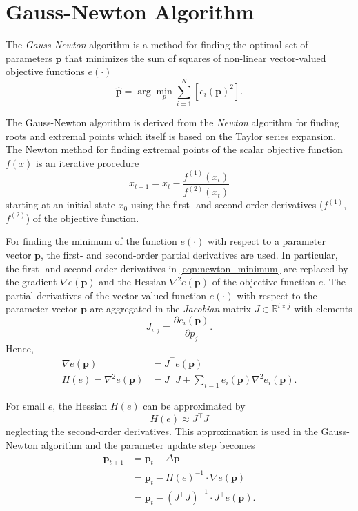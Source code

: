 \section{Gauss-Newton Algorithm}

The \textit{Gauss-Newton} algorithm is a method for finding the optimal set of parameters $\mathbf{p}$ that minimizes the sum of squares of non-linear vector-valued objective functions $e(\cdot)$
%
\begin{equation}
\hat{\mathbf{p}} = \arg\min_{p} \sum_{i=1}^N\left[ e_i(\mathbf{p})^2\right] .
\end{equation}

The Gauss-Newton algorithm is derived from the \textit{Newton} algorithm for finding roots and extremal points which itself is based on the Taylor series expansion. The Newton method for finding extremal points of the scalar objective function $f(x)$ is an iterative procedure
%
\begin{equation}
x_{t+1} = x_t - \frac{f^{(1)}(x_t)}{f^{(2)}(x_t)}
\label{eqn:newton_minimum}
\end{equation}
%
starting at an initial state $x_0$ using the first- and second-order derivatives ($f^{(1)}$, $f^{(2)}$) of the objective function.

For finding the minimum of the function $e(\cdot)$ with respect to a parameter vector $\mathbf{p}$, the first- and second-order partial derivatives are used. In particular, the first- and second-order derivatives in \ref{eqn:newton_minimum} are replaced by the gradient $\nabla e(\mathbf{p})$ and the Hessian $\nabla^2 e(\mathbf{p})$ of the objective function $e$.
The partial derivatives of the vector-valued function $e(\cdot)$ with respect to the parameter vector $\mathbf{p}$ are aggregated in the \textit{Jacobian} matrix $J\in \mathbb{R}^{i \times j}$ with elements
%
\begin{equation}
J_{i,j} = \frac{\partial e_i(\mathbf{p})}{\partial p_j} .
\end{equation}
%
Hence,
\begin{align}
\nabla e(\mathbf{p}) &= J^\top e(\mathbf{p}) \label{eqn:gn_gradient}\\
H(e) = \nabla^2 e(\mathbf{p}) &= J^\top J +  \sum_{i=1} e_i(\mathbf{p}) \nabla^2 e_i(\mathbf{p}) \label{eqn:gn_hessian_full}.
\end{align}

For small $e$, the Hessian $H(e)$ can be approximated by
\begin{equation}
H(e) \approx J^\top J \label{eqn:gn_hessian}
\end{equation}
%
neglecting the second-order derivatives. This approximation is used in the Gauss-Newton algorithm and the parameter update step becomes
%
\begin{align}
\mathbf{p}_{t+1} &= \mathbf{p}_{t} - \Delta\mathbf{p} \\
&= \mathbf{p}_{t} - H(e)^{-1} \cdot \nabla e(\mathbf{p}) \\
&= \mathbf{p}_{t} - \left(J^\top J\right)^{-1} \cdot J^\top e(\mathbf{p}) \label{eqn:gn_param_update}.
\end{align}

